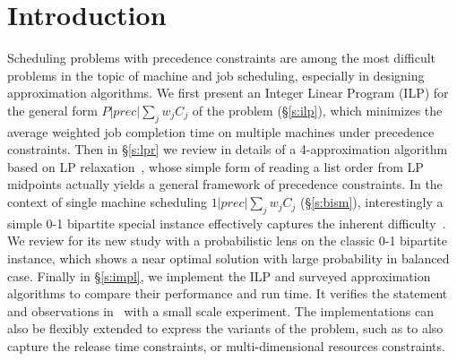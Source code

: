 \section{Introduction} \label{s:intro}
Scheduling problems with precedence constraints are among the most difficult
problems in the topic of machine and job scheduling, especially in designing
approximation algorithms. We first present an Integer Linear Program (ILP) for
the general form $P|prec|\sum_j w_jC_j$ of the problem (\S\ref{s:ilp}), which
minimizes the average weighted job completion time on multiple machines under
precedence constraints. Then in \S\ref{s:lpr} we review in details of a
4-approximation algorithm based on LP
relaxation~\cite{queyranne2006approximation}, whose simple form of reading a
list order from LP midpoints actually yields a general framework of precedence
constraints. In the context of single machine scheduling $1|prec|\sum_j w_jC_j$
(\S\ref{s:bism}), interestingly a simple 0-1 bipartite special instance
effectively captures the inherent
difficulty~\cite{woeginger2003approximability}. We review \cite{schulz2011near}
for its new study with a probabilistic lens on the classic 0-1 bipartite
instance, which shows a near optimal solution with large probability in balanced
case. Finally in \S\ref{s:impl}, we implement the ILP and surveyed approximation
algorithms to compare their performance and run time. It verifies the statement
and observations in~\cite{schulz2011near} with a small scale experiment. The
implementations can also be flexibly extended to express the variants of the
problem, such as to also capture the release time constraints, or
multi-dimensional resources constraints.



